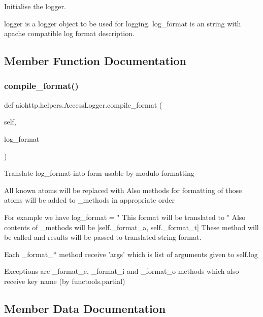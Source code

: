 \begin{DoxyVerb}
\begin{DoxyVerb}Initialise the logger.

logger is a logger object to be used for logging.
log_format is an string with apache compatible log format description.\end{DoxyVerb}
 

\subsection{Member Function Documentation}
\mbox{\label{classaiohttp_1_1helpers_1_1_access_logger_a9e53e1bdb16592c153a0ce7400acc1b8}} 
\subsubsection{\texorpdfstring{compile\+\_\+format()}{compile\_format()}}
{\footnotesize\ttfamily def aiohttp.\+helpers.\+Access\+Logger.\+compile\+\_\+format (\begin{DoxyParamCaption}\item[{}]{self,  }\item[{}]{log\+\_\+format }\end{DoxyParamCaption})}

\begin{DoxyVerb}Translate log_format into form usable by modulo formatting

All known atoms will be replaced with %
Also methods for formatting of those atoms will be added to
_methods in appropriate order

For example we have log_format = "%
This format will be translated to "%
Also contents of _methods will be
[self._format_a, self._format_t]
These method will be called and results will be passed
to translated string format.

Each _format_* method receive 'args' which is list of arguments
given to self.log

Exceptions are _format_e, _format_i and _format_o methods which
also receive key name (by functools.partial)\end{DoxyVerb}
 

\subsection{Member Data Documentation}
\mbox{\label{classaiohttp_1_1helpers_1_1_access_logger_a573c348b998ef6112f9b8436c27cef0c}} 

\end{DoxyVerb}
